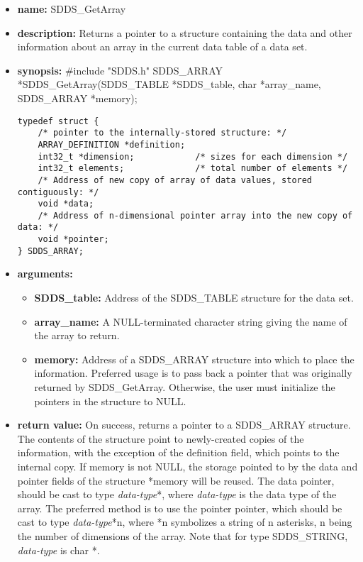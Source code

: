 \documentclass[11pt]{article}
\begin{document}
\begin{itemize}
\item {\bf name:}\newline
SDDS\_GetArray
\item {\bf description:}\newline
Returns a pointer to a structure containing the data and other information about an array in the current data table of a data set.
\item {\bf synopsis:} \#include "SDDS.h"\newline
SDDS\_ARRAY *SDDS\_GetArray(SDDS\_TABLE *SDDS\_table, char *array\_name, SDDS\_ARRAY *memory);\newline
\begin{verbatim}
typedef struct {
    /* pointer to the internally-stored structure: */
    ARRAY_DEFINITION *definition; 
    int32_t *dimension;            /* sizes for each dimension */
    int32_t elements;              /* total number of elements */
    /* Address of new copy of array of data values, stored contiguously: */
    void *data;
    /* Address of n-dimensional pointer array into the new copy of data: */
    void *pointer;
} SDDS_ARRAY;
\end{verbatim}
\item {\bf arguments:}
\begin{itemize}
\item {\bf SDDS\_table:} Address of the SDDS\_TABLE structure for the data set.
\item {\bf array\_name:} A NULL-terminated character string giving the name of the array to return.
\item {\bf memory:} Address of a SDDS\_ARRAY structure into which to place the information. Preferred usage is to pass back a pointer that was originally returned by SDDS\_GetArray. Otherwise, the user must initialize the pointers in the structure to NULL.
\end{itemize}
\item {\bf return value:}\newline
On success, returns a pointer to a SDDS\_ARRAY structure. The contents of the structure point to newly-created copies of the information, with the exception of the  definition field, which points to the internal copy. If  memory is not NULL, the storage pointed to by the  data and  pointer fields of the structure  *memory will be reused. The  data pointer, should be cast to type {\em data-type}*, where {\em data-type} is the data type of the array. The preferred method is to use the  pointer pointer, which should be cast to type {\em data-type}*n, where *n symbolizes a string of n asterisks, n being the number of dimensions of the array. Note that for type SDDS\_STRING, {\em data-type} is char *.\newline

\end{itemize}
\end{document}

